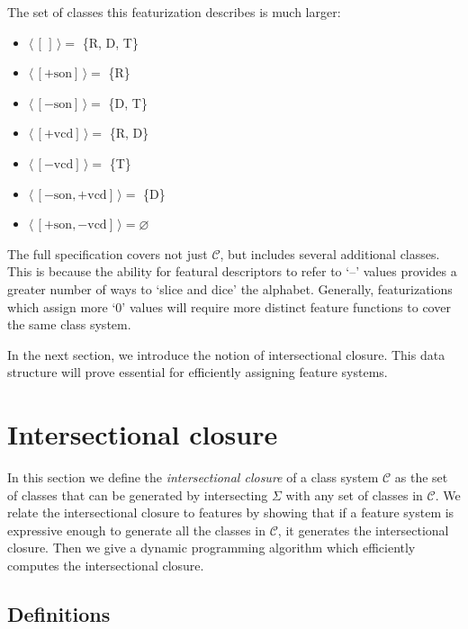 \documentclass[11pt, oneside]{article}   	%
\begin{document}
\noindent The set of classes this featurization describes is much larger: \begin{itemize}
    \item $\langle \, [\,] \, \rangle =$ \{R, D, T\}
    \item $\langle \, [+\text{son}] \, \rangle =$ \{R\}
    \item $\langle \, [-\text{son}] \, \rangle =$ \{D, T\}
    \item $\langle \, [+\text{vcd}] \, \rangle =$ \{R, D\}
    \item $\langle \, [-\text{vcd}]  \, \rangle=$ \{T\}
    \item $\langle \, [-\text{son},+\text{vcd}] \, \rangle =$ \{D\}
    \item $\langle \, [+\text{son},-\text{vcd}] \, \rangle = \varnothing$
    \end{itemize}

\vspace{\baselineskip} \noindent The full specification covers not just $\mathcal C$, but includes several additional classes. This is because the ability for featural descriptors to refer to `--' values provides a greater number of ways to `slice and dice' the alphabet. Generally, featurizations which assign more `$0$' values will require more distinct feature functions to cover the same class system.

\vspace{\baselineskip} In the next section, we introduce the notion of intersectional closure. This data structure will prove essential for efficiently assigning feature systems.

\section{Intersectional closure}

In this section we define the \textit{intersectional closure} of a class system $\mathcal{C}$ as the set of classes that can be generated by intersecting $\Sigma$ with any set of classes in $\mathcal{C}$. We relate the intersectional closure to features by showing that if a feature system is expressive enough to generate all the classes in $\mathcal{C}$, it generates the intersectional closure. Then we give a dynamic programming algorithm which efficiently computes the intersectional closure. 

\subsection{Definitions}
\end{document}
